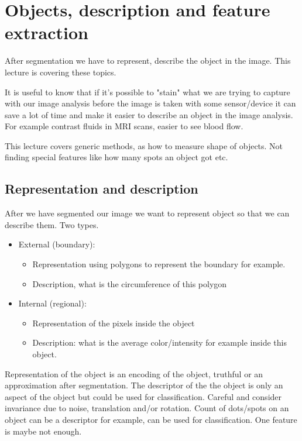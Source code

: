 

\section{Objects, description and feature extraction}
After segmentation we have to represent, describe the object in the image. This lecture is covering these topics. 


It is useful to know that if it's possible to "stain" what we are trying to capture with our image analysis before the image is taken with some sensor/device it can save a lot of time and make it easier to describe an object in the image analysis. For example contrast fluids in MRI scans, easier to see blood flow. 

This lecture covers generic methods, as how to measure shape of objects. Not finding special features like how many spots an object got etc. 

\subsection*{Representation and description}
After we have segmented our image we want to represent object so that we can describe them. Two types. 

\begin{itemize}
	\item External (boundary): 
	\begin{itemize}
		\item Representation using polygons to represent the boundary for example.
		\item Description, what is the circumference of this polygon
	\end{itemize}
	\item Internal (regional):
	\begin{itemize}
		\item Representation of the pixels inside the object
		\item Description: what is the average color/intensity for example inside this object. 
	\end{itemize}
\end{itemize}

Representation of the object is an encoding of the object, truthful or an approximation after segmentation. The descriptor of the the object is only an aspect of the object but could be used for classification. Careful and consider invariance due to noise, translation and/or rotation. Count of dots/spots on an object can be a descriptor for example, can be used for classification. One feature is maybe not enough. 

